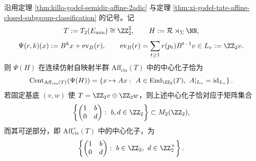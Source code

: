 \begin{theorem}\label{thm:xi-time-part69d-godel-tate-affine-centralizer-complete}
沿用定理 \ref{thm:killo-godel-semidir-affine-2adic} 与定理 \ref{thm:xi-godel-tate-affine-closed-subgroup-classification} 的记号。记
\[
T:=T_2(E_{\min})\cong \ZZ_2^2,
\qquad
H:=\mathcal R\rtimes_\Sigma \NN,
\]
\[
\Psi(r,k)(x):=B^k x+\operatorname{ev}_B(r),
\qquad
\operatorname{ev}_B(r)=\sum_{t\ge 1}r(p_t)B^{t-1}v\in L_v:=\ZZ_2v.
\]
则 \(\Psi(H)\) 在连续仿射自映射半群
\(
\mathrm{Aff}_{\mathrm{cts}}(T)
\)
中的中心化子恰为
\[
\operatorname{Cent}_{\mathrm{Aff}_{\mathrm{cts}}(T)}(\Psi(H))
=
\left\{
x\mapsto Ax:\ A\in \operatorname{End}_{\ZZ_2}(T),\ A|_{L_v}=\mathrm{id}_{L_v}
\right\}.
\]
若固定基底 \((v,w)\) 使
\(
T=\ZZ_2v\oplus \ZZ_2w
\)，则上述中心化子恰对应于矩阵集合
\[
\left\{
\begin{pmatrix}
1 & b\\
0 & d
\end{pmatrix}
:\ b,d\in\ZZ_2
\right\}
\subset M_2(\ZZ_2),
\]
而其可逆部分，即
\(
\mathrm{Aff}_{\mathrm{cts}}^\times(T)
\)
中的中心化子，为
\[
\left\{
\begin{pmatrix}
1 & b\\
0 & d
\end{pmatrix}
:\ b\in\ZZ_2,\ d\in\ZZ_2^\times
\right\}.
\]
\end{theorem}
